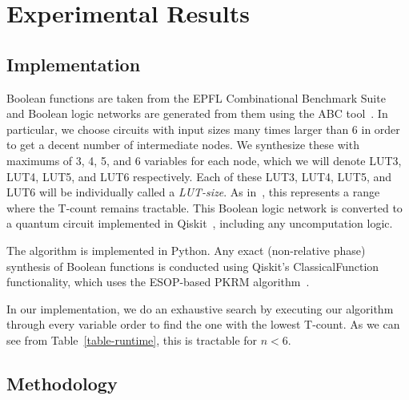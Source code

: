 \section{Experimental Results}
\label{Sec:exp}

\subsection{Implementation}
Boolean functions are taken from the EPFL Combinational Benchmark Suite~\cite{bib-epfl} and Boolean logic networks are generated from them using the ABC tool~\cite{bib-abc}. In particular, we choose circuits with input sizes many times larger than 6 in order to get a decent number of intermediate nodes. We synthesize these with maximums of 3, 4, 5, and 6 variables for each node, which we will denote LUT3, LUT4, LUT5, and LUT6 respectively. Each of these LUT3, LUT4, LUT5, and LUT6 will be individually called a \emph{LUT-size}. As in~\cite{bib-barenco-elementary}, this represents a range where the T-count remains tractable. This Boolean logic network is converted to a quantum circuit implemented in Qiskit~\cite{bib-qiskit}, including any uncomputation logic.

The algorithm is implemented in Python. Any exact (non-relative phase) synthesis of Boolean functions is conducted using Qiskit's ClassicalFunction functionality, which uses the ESOP-based PKRM algorithm~\cite{bib-pkrm}. 

In our implementation, we do an exhaustive search by executing our algorithm through every variable order to find the one with the lowest T-count. As we can see from Table~\ref{table-runtime}, this is tractable for $n < 6$.

\subsection{Methodology} 

